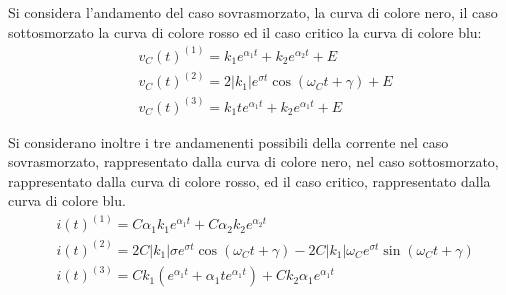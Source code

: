 \documentclass{article}
\numberwithin{equation}{subsection}
\begin{document}
Si considera l'andamento del caso sovrasmorzato, la curva di colore nero, il caso sottosmorzato la curva di colore rosso ed il caso critico la curva di colore blu: 
\begin{align*}
    &v_C(t)^{(1)}=k_1e^{\alpha_1t}+k_2e^{\alpha_2t}+E\\
    &v_C(t)^{(2)}=2|k_1|e^{\sigma t}\cos(\omega_Ct+\gamma)+E\\
    &v_C(t)^{(3)}=k_1te^{\alpha_1t}+k_2e^{\alpha_1t}+E
\end{align*}
\begin{center}
\end{center}
Si considerano inoltre i tre andamenenti possibili della corrente nel caso sovrasmorzato, rappresentato dalla curva di colore nero, nel caso sottosmorzato, 
rappresentato dalla curva di colore rosso, ed il caso critico, rappresentato dalla curva di colore blu. 
\begin{align*}
    &i(t)^{(1)}=C\alpha_1k_1e^{\alpha_1t}+C\alpha_2k_2e^{\alpha_2t}\\
    &i(t)^{(2)}=2C|k_1|\sigma e^{\sigma t}\cos(\omega_Ct+\gamma)-2C|k_1|\omega_Ce^{\sigma t}\sin(\omega_Ct+\gamma)\\
    &i(t)^{(3)}=Ck_1(e^{\alpha_1t}+\alpha_1te^{\alpha_1t})+Ck_2\alpha_1e^{\alpha_1t}
\end{align*}
\begin{center}
\end{center}
\end{document}
